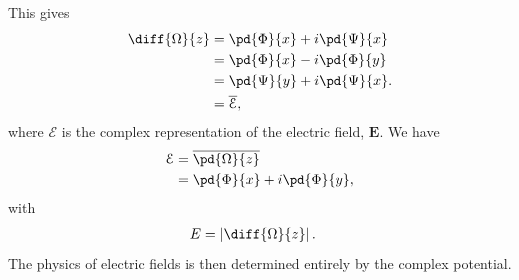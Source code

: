\documentclass[10pt]{mypackage}
\begin{document}
This gives
\begin{align*}
  \diff{\Omega}{z} &= \pd{\Phi}{x} + i \pd{\Psi}{x}\\
                   &= \pd{\Phi}{x} - i\pd{\Phi}{y}\\
                   &= \pd{\Psi}{y} + i \pd{\Psi}{x}.\\
                   &= \overline{\mathcal{E}},
\end{align*}
where $\mathcal{E}$ is the complex representation of the electric field, $\mathbf{E}$. We have
\begin{align*}
  \mathcal{E} &= \overline{\pd{\Omega}{z}}\\
              &= \pd{\Phi}{x} + i\pd{\Phi}{y},
\end{align*}
with
\begin{align*}
  E &= \left\vert \diff{\Omega}{z} \right\vert.
\end{align*}
The physics of electric fields is then determined entirely by the complex potential.\newline
\end{document}
